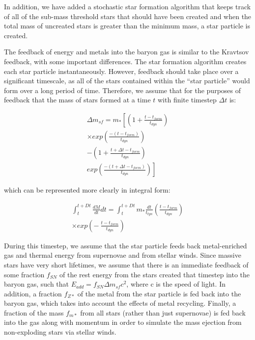 In addition, we have added a stochastic star formation algorithm that keeps 
track of all of the sub-mass threshold stars that should have been created 
and when the total mass of uncreated stars is greater than the minimum mass, 
a star particle is created.

The feedback of energy and metals into the baryon gas is similar to
the Kravtsov feedback, with some important differences.  The star formation 
algorithm creates each star particle instantaneously.  However, feedback
should take place over a significant timescale, as all of the stars contained
within the ``star particle'' would form over a long period of time.  Therefore,
we assume that for the purposes of feedback that the mass of stars formed
at a time $t$ with finite timestep $\Delta t$ is:

\begin{eqnarray}  
\Delta m_{sf} =  m_{*} \left[ \right. \left(1 + \frac{t-t_{form}}{t_{dyn}} 
                    \right) \nonumber \\ 
		   \times exp \left( \frac{-(t-t_{form})}{t_{dyn}} \right) 
                    \nonumber \\ 
	       - \left( 1 + \frac{t+ \Delta t-t_{form}}{t_{dyn}} \right) \nonumber \\ 
                    exp \left( \frac{-(t+\Delta t-t_{form})}{t_{dyn}} \right) 
                   \left. \right]
\end{eqnarray}

which can be represented more clearly in integral form:

\begin{eqnarray}
\int_{t}^{t+Dt} \frac{dM}{dt} dt = \int_{t}^{t+Dt} m_{*} 
\frac{dt}{t_{tyn}} \left( \frac{t-t_{form}}{t_{dyn}} \right) \nonumber \\ 
\times exp \left( - ~ \frac{t-t_{form}}{t_{dyn}} \right) 
\end{eqnarray}

During this timestep, we assume that the star particle feeds back
metal-enriched gas and thermal energy from supernovae and from stellar winds.
Since massive stars have very short lifetimes, we assume that there is an
immediate feedback of some fraction $f_{SN}$ of the rest energy from the
stars created that timestep into the baryon gas, such that 
$E_{add} = f_{SN} \Delta m_{sf} c^2$, where c is the speed of light.
In addition, a fraction $f_{Z*}$ of the metal from the star particle
is fed back into the baryon gas, which takes into account the effects
of metal recycling.  Finally, a fraction of the mass $f_{m*}$ from all
stars (rather than just supernovae) is fed back into the gas along with
momentum in order to simulate the mass ejection from non-exploding stars
via stellar winds.


